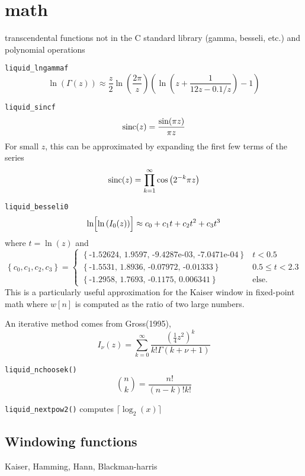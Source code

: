 % 
%

\section{math}
\label{module:math}
transcendental functions not in the C standard library (gamma, besseli, etc.)
and polynomial operations

{\tt liquid\_lngammaf}
\[
    \ln(\Gamma(z)) \approx
    \frac{z}{2} \ln\left( \frac{2\pi}{z} \right)
    \left(
        \ln\left(z + \frac{1}{12 z - 0.1/z} \right) - 1
    \right)
\]

{\tt liquid\_sincf}
\[ \textup{sinc}(z) = \frac{\sin(\pi z)}{\pi z} \]
For small $z$, this can be approximated by expanding the first few terms of
the series
\[
    \textup{sinc}(z) = \prod_{k=1}^{\infty}{ \cos\left( 2^{-k} \pi z \right) }
\]

{\tt liquid\_besseli0}
\[
    \ln\Bigl[\ln\left(I_0(z)\right)\Bigr] \approx
    c_0 + c_1 t + c_2 t ^2 + c_3 t^3
\]
where $t=\ln(z)$ and
\[
    \left\{c_0,c_1,c_2,c_3\right\} =
    \begin{cases}
    \left\{\text{-1.52624, 1.9597, -9.4287e-03, -7.0471e-04}\right\} & t < 0.5 \\
    \left\{\text{-1.5531, 1.8936, -0.07972, -0.01333}\right\} & 0.5 \le t < 2.3 \\
    \left\{\text{-1.2958, 1.7693, -0.1175, 0.006341}\right\} & \text{else}.
    \end{cases}
\]
This is a particularly useful approximation for the Kaiser window in
fixed-point math where $w[n]$ is computed as the ratio of two large numbers.

An iterative method comes from Gross(1995),
\[
    I_\nu(z) = \sum_{k=0}^{\infty}{\frac{\left(\frac{1}{4}z^2\right)^k}{k!\Gamma(k+\nu+1)}}
\]

{\tt liquid\_nchoosek()}
\[
    {n \choose k} = \frac{n!}{(n-k)!k!}
\]

{\tt liquid\_nextpow2()} computes $\lceil \log_2(x) \rceil$

\subsection{Windowing functions}
Kaiser, Hamming, Hann, Blackman-harris

